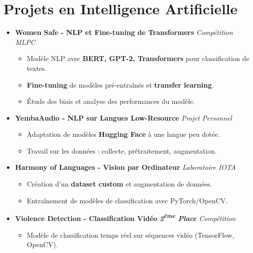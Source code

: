 \documentclass[a4paper,11pt]{article}
\begin{document}
\section{Projets en Intelligence Artificielle}
\begin{itemize}[leftmargin=*, label={}]

\item \textbf{Women Safe - NLP et Fine-tuning de Transformers} \hfill \textit{Compétition MLPC}
\vspace{-2pt}
    \begin{itemize}[leftmargin=0.4cm, nosep, label=\tiny$\bullet$]
        \item \small{Modèle NLP avec \textbf{BERT, GPT-2, Transformers} pour classification de textes.}
        \item \small{\textbf{Fine-tuning} de modèles pré-entraînés et \textbf{transfer learning}.}
        \item \small{Étude des biais et analyse des performances du modèle.}
    \end{itemize}
    \vspace{3pt}

\item \textbf{YembaAudio - NLP sur Langues Low-Resource} \hfill \textit{Projet Personnel}
\vspace{-2pt}
    \begin{itemize}[leftmargin=0.4cm, nosep, label=\tiny$\bullet$]
        \item \small{Adaptation de modèles \textbf{Hugging Face} à une langue peu dotée.}
        \item \small{Travail sur les données : collecte, prétraitement, augmentation.}
    \end{itemize}
    \vspace{3pt}

\item \textbf{Harmony of Languages - Vision par Ordinateur} \hfill \textit{Laboratoire IOTA}
\vspace{-2pt}
    \begin{itemize}[leftmargin=0.4cm, nosep, label=\tiny$\bullet$]
        \item \small{Création d'un \textbf{dataset custom} et augmentation de données.}
        \item \small{Entraînement de modèles de classification avec PyTorch/OpenCV.}
    \end{itemize}
    \vspace{3pt}

\item \textbf{Violence Detection - Classification Vidéo} \hfill \textit{\textbf{2\textsuperscript{ème} Place} Compétition}
\vspace{-2pt}
    \begin{itemize}[leftmargin=0.4cm, nosep, label=\tiny$\bullet$]
        \item \small{Modèle de classification temps réel sur séquences vidéo (TensorFlow, OpenCV).}
    \end{itemize}

\end{itemize}
\end{document}
